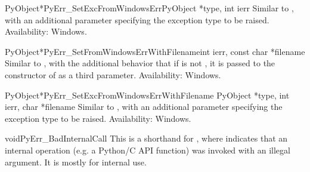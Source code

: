 \begin{cfuncdesc}{PyObject*}{PyErr_SetExcFromWindowsErr}{PyObject *type,
	                                                 int ierr}
  Similar to , with an additional
  parameter specifying the exception type to be raised.
  Availability: Windows.
\end{cfuncdesc}

\begin{cfuncdesc}{PyObject*}{PyErr_SetFromWindowsErrWithFilename}{int ierr,
                                                                const char *filename}
  Similar to , with the
  additional behavior that if  is not \NULL, it is
  passed to the constructor of  as a third
  parameter.
  Availability: Windows.
\end{cfuncdesc}

\begin{cfuncdesc}{PyObject*}{PyErr_SetExcFromWindowsErrWithFilename}
	{PyObject *type, int ierr, char *filename}
  Similar to , with
  an additional parameter specifying the exception type to be raised.
  Availability: Windows.
\end{cfuncdesc}

\begin{cfuncdesc}{void}{PyErr_BadInternalCall}{}
  This is a shorthand for , where  indicates that an internal
  operation (e.g. a Python/C API function) was invoked with an illegal
  argument.  It is mostly for internal use.
\end{cfuncdesc}

